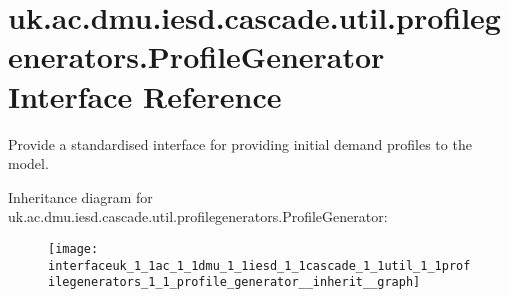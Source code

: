 \hypertarget{interfaceuk_1_1ac_1_1dmu_1_1iesd_1_1cascade_1_1util_1_1profilegenerators_1_1_profile_generator}{\section{uk.\-ac.\-dmu.\-iesd.\-cascade.\-util.\-profilegenerators.\-Profile\-Generator Interface Reference}
\label{interfaceuk_1_1ac_1_1dmu_1_1iesd_1_1cascade_1_1util_1_1profilegenerators_1_1_profile_generator}
}


Provide a standardised interface for providing initial demand profiles to the model.  




Inheritance diagram for uk.\-ac.\-dmu.\-iesd.\-cascade.\-util.\-profilegenerators.\-Profile\-Generator\-:\nopagebreak
\begin{figure}[H]
\begin{center}
\leavevmode
\texttt{[image: interfaceuk\_1\_1ac\_1\_1dmu\_1\_1iesd\_1\_1cascade\_1\_1util\_1\_1profilegenerators\_1\_1\_profile\_generator\_\_inherit\_\_graph]}
\end{center}
\end{figure}
